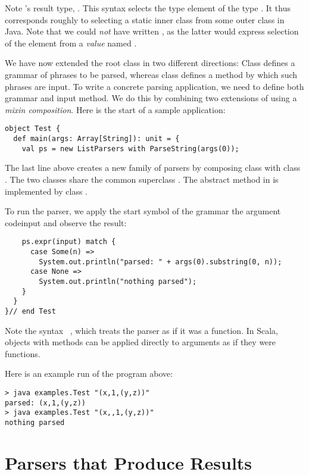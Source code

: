 \documentclass[a4paper,12pt,twoside,titlepage]{book}
\begin{document}
{Note 's result type, . This syntax
selects the type element  of the type . It
thus corresponds roughly to selecting a static inner class from some
outer class in Java. Note that we could {\em not} have written
, as the latter would express selection of the
 element from a {\em value} named .

We have now extended the root class  in two different
directions: Class  defines a grammar of phrases to
be parsed, whereas class  defines a method by which
such phrases are input. To write a concrete parsing application, we
need to define both grammar and input method. We do this by combining
two extensions of  using a {\em mixin composition}.
Here is the start of a sample application:
\begin{lstlisting}
object Test {
  def main(args: Array[String]): unit = {
    val ps = new ListParsers with ParseString(args(0));
\end{lstlisting}
The last line above creates a new family of parsers by composing class
 with class . The two classes
share the common superclass . The abstract method
 in  is implemented by class .

To run the parser, we apply the start symbol of the grammar
 the argument code{input} and observe the result:
\begin{lstlisting}
    ps.expr(input) match { 
      case Some(n) => 
        System.out.println("parsed: " + args(0).substring(0, n)); 
      case None =>
        System.out.println("nothing parsed"); 
    }
  }
}// end Test
\end{lstlisting}
Note the syntax ~, which treats the 
parser as if it was a function. In Scala, objects with 
methods can be applied directly to arguments as if they were functions.

Here is an example run of the program above:
\begin{lstlisting}
> java examples.Test "(x,1,(y,z))"
parsed: (x,1,(y,z))
> java examples.Test "(x,,1,(y,z))"
nothing parsed
\end{lstlisting}

\section{\label{sec:parsers-results}Parsers that Produce Results}

}
\end{document}

